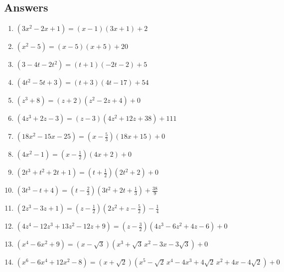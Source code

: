 \documentclass{ximera}
\begin{document}
	\author{Stitz-Zeager}


\subsection{Answers}


\begin{enumerate}

\item $\left(3x^2-2x+1 \right) = \left(x-1\right) (3x+1)+2$
\item $\left(x^2-5 \right)= \left(x-5\right)(x+5) + 20$


\item $\left(3-4t-2t^2 \right) = \left(t+1\right)(-2t-2)+5$
\item $\left(4t^2-5t +3\right) = \left(t+3\right)(4t-17)+54$


\item $\left(z^3 + 8 \right) = \left(z+2\right) \left(z^2-2z+4\right) + 0$
\item $\left(4z^3 +2z-3 \right) = \left(z -3\right) \left(4z^2+12z+38\right) + 111$


\item $\left(18x^2-15x-25\right) = \left(x - \frac{5}{3} \right)(18x+15)+0$
\item $\left(4x^2-1 \right) = \left(x - \frac{1}{2} \right)(4x+2)+0$


\item $\left(2t^3+t^2+2t+1 \right) = \left(t + \frac{1}{2} \right)\left(2t^2+2\right)+0$
\item $\left(3t^3 - t + 4 \right) = \left(t - \frac{2}{3} \right) \left(3t^2+2t+\frac{1}{3}\right) + \frac{38}{9}$


\item $\left(2z^3 - 3z +1 \right) = \left(z - \frac{1}{2} \right) \left(2z^2+z-\frac{5}{2}\right)-\frac{1}{4}$
\item $\left(4z^4-12z^3+13z^2 -12z+9\right) = \left(z - \frac{3}{2} \right) \left(4z^3-6z^2+4z-6 \right)+0$

\item $\left(x^4-6x^2+9 \right) = \left(x -\sqrt{3} \right) \left(x^3+\sqrt{3} \,x^2-3x-3\sqrt{3}\right) + 0$
\item $\left(x^6-6x^4+12x^2-8\right) = \left(x +\sqrt{2} \right) \left(x^5-\sqrt{2} \, x^4-4x^3+4\sqrt{2} \, x^2+4x-4\sqrt{2}\right) + 0$


\setcounter{HW}{\value{enumi}}
\end{enumerate}
\end{document}

